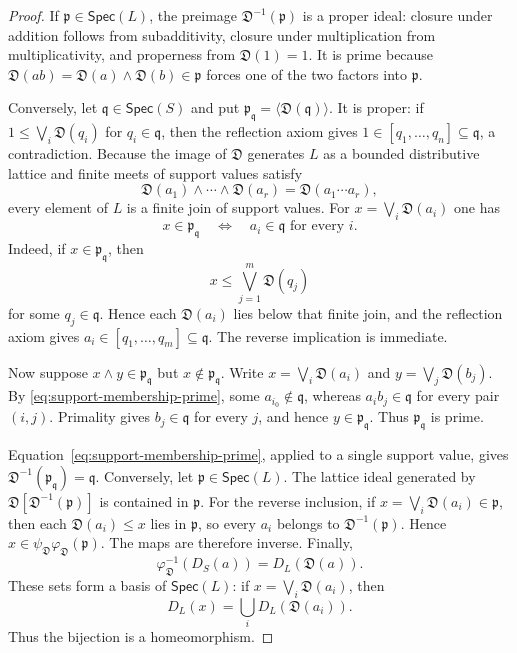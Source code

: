 \documentclass[12pt,leqno]{amsart}
\newcommand{\Spec}{\mathsf{Spec}}
\theoremstyle{definition}
\numberwithin{equation}{section}
\theoremstyle{remark}
\def\leq{\leqslant}
\begin{document}
\begin{proof}
If \(\mathfrak p\in\Spec(L)\), the preimage \(\mathfrak D^{-1}(\mathfrak p)\) is a proper ideal: closure under addition follows from subadditivity, closure under multiplication from multiplicativity, and properness from \(\mathfrak D(1)=1\). It is prime because
\(\mathfrak D(ab)=\mathfrak D(a)\wedge\mathfrak D(b)\in\mathfrak p\) forces one of the two factors into \(\mathfrak p\).

Conversely, let \(\mathfrak q\in\Spec(S)\) and put
\(\mathfrak p_{\mathfrak q}=\langle\mathfrak D(\mathfrak q)\rangle\). It is proper: if
\(1\leq\bigvee_i\mathfrak D(q_i)\) for \(q_i\in\mathfrak q\), then the reflection axiom gives
\(1\in[q_1,\ldots,q_n]\subseteq\mathfrak q\), a contradiction. Because the image of \(\mathfrak D\) generates $L$ as a bounded distributive lattice and finite meets of support values satisfy
\[
\mathfrak D(a_1)\wedge\cdots\wedge\mathfrak D(a_r)
 =\mathfrak D(a_1\cdots a_r),
\]
every element of $L$ is a finite join of support values. For
\(x=\bigvee_i\mathfrak D(a_i)\) one has
\begin{equation}\label{eq:support-membership-prime}
x\in\mathfrak p_{\mathfrak q}
\quad\Longleftrightarrow\quad
a_i\in\mathfrak q\text{ for every }i.
\end{equation}
Indeed, if \(x\in\mathfrak p_{\mathfrak q}\), then
\[
x\leq\bigvee_{j=1}^m\mathfrak D(q_j)
\]
for some \(q_j\in\mathfrak q\). Hence each \(\mathfrak D(a_i)\) lies below that finite join, and the reflection axiom gives
\(a_i\in[q_1,\ldots,q_m]\subseteq\mathfrak q\). The reverse implication is immediate.

Now suppose \(x\wedge y\in\mathfrak p_{\mathfrak q}\) but \(x\notin\mathfrak p_{\mathfrak q}\). Write
\(x=\bigvee_i\mathfrak D(a_i)\) and \(y=\bigvee_j\mathfrak D(b_j)\). By \eqref{eq:support-membership-prime}, some \(a_{i_0}\notin\mathfrak q\), whereas
\(a_i b_j\in\mathfrak q\) for every pair \((i,j)\). Primality gives \(b_j\in\mathfrak q\) for every $j$, and hence \(y\in\mathfrak p_{\mathfrak q}\). Thus \(\mathfrak p_{\mathfrak q}\) is prime.

Equation~\eqref{eq:support-membership-prime}, applied to a single support value, gives
\(\mathfrak D^{-1}(\mathfrak p_{\mathfrak q})=\mathfrak q\). Conversely, let \(\mathfrak p\in\Spec(L)\). The lattice ideal generated by
\(\mathfrak D[\mathfrak D^{-1}(\mathfrak p)]\) is contained in \(\mathfrak p\). For the reverse inclusion, if
\(x=\bigvee_i\mathfrak D(a_i)\in\mathfrak p\), then each \(\mathfrak D(a_i)\leq x\) lies in \(\mathfrak p\), so every $a_i$ belongs to \(\mathfrak D^{-1}(\mathfrak p)\). Hence
\(x\in\psi_{\mathfrak D}\varphi_{\mathfrak D}(\mathfrak p)\). The maps are therefore inverse. Finally,
\[
\varphi_{\mathfrak D}^{-1}(D_S(a))=D_L(\mathfrak D(a)).
\]
These sets form a basis of \(\Spec(L)\): if \(x=\bigvee_i\mathfrak D(a_i)\), then
\[
D_L(x)=\bigcup_i D_L(\mathfrak D(a_i)).
\]
Thus the bijection is a homeomorphism.
\end{proof}
\end{document}
